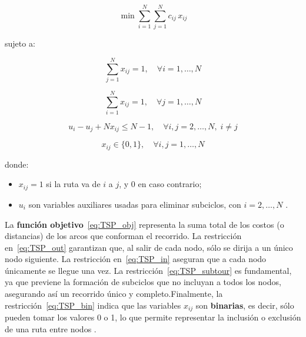 \documentclass[12pt,titlepage,twoside,openright]{book}
\begin{document}
\begin{equation}
	\min \sum_{i=1}^N \sum_{j=1}^N c_{ij}\,x_{ij}
	\label{eq:TSP_obj}
\end{equation}

sujeto a:

\begin{equation}
	\sum_{j=1}^N x_{ij} = 1, \quad \forall i = 1,\dots,N
	\label{eq:TSP_out}
\end{equation}

\begin{equation}
	\sum_{i=1}^N x_{ij} = 1, \quad \forall j = 1,\dots,N
	\label{eq:TSP_in}
\end{equation}

\begin{equation}
	u_i - u_j + N x_{ij} \leq N - 1, \quad \forall i,j = 2,\dots,N, \; i \neq j
	\label{eq:TSP_subtour}
\end{equation}

\begin{equation}
	x_{ij} \in \{0,1\}, \quad \forall i,j = 1,\dots,N
	\label{eq:TSP_bin}
\end{equation}

\medskip

\noindent donde:
\begin{itemize}
	\item \(x_{ij} = 1\) si la ruta va de \(i\) a \(j\), y 0 en caso contrario;
	\item \(u_i\) son variables auxiliares usadas para eliminar subciclos, con \(i=2,\dots,N\) \citep{torres2018}.
\end{itemize}

La \textbf{función objetivo}~\eqref{eq:TSP_obj} representa la suma total de los costos (o distancias) de los arcos que conforman el recorrido. La restricción en~\eqref{eq:TSP_out} garantizan que, al salir de cada nodo, sólo se dirija a un único nodo siguiente. La restricción en~\eqref{eq:TSP_in} aseguran que a cada nodo únicamente se llegue una vez. La restricción~\eqref{eq:TSP_subtour} es fundamental, ya que previene la formación de subciclos que no incluyan a todos los nodos, asegurando así un recorrido único y completo.Finalmente, la restricción~\eqref{eq:TSP_bin} indica que las variables \(x_{ij}\) son \textbf{binarias}, es decir, sólo pueden tomar los valores 0 o 1, lo que permite representar la inclusión o exclusión de una ruta entre nodos \citep{torres2018}.
\end{document}
